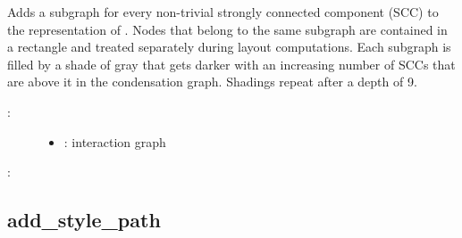 \documentclass[letterpaper,10pt,english]{sphinxmanual}
\begin{document}
\begin{fulllineitems}
\label{\detokenize{InteractionGraphs:PyBoolNet.InteractionGraphs.add_style_sccs}}
Adds a subgraph for every non-trivial strongly connected component (SCC) to the  representation of .
Nodes that belong to the same  subgraph are contained in a rectangle and treated separately during layout computations.
Each subgraph is filled by a shade of gray that gets darker with an increasing number of SCCs that are above it in the condensation graph.
Shadings repeat after a depth of 9.
\begin{description}
\item[{:}] \leavevmode\begin{itemize}
\item {} 
: interaction graph

\end{itemize}

\end{description}

:

\begin{sphinxVerbatim}[commandchars=\\\{\}]
\end{sphinxVerbatim}

\end{fulllineitems}



\subsection{add\_style\_path}
\label{\detokenize{InteractionGraphs:add-style-path}}\label{\detokenize{InteractionGraphs:id15}}
\end{document}
